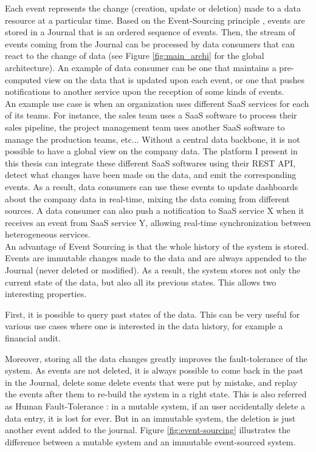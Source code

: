 Each event represents the change (creation, update or deletion) made to a data resource at a particular time. Based on the Event-Sourcing principle , events are stored in a Journal that is an ordered sequence of events. Then, the stream of events coming from the Journal can be processed by data consumers that can react to the change of data (see Figure \ref{fig:main_archi} for the global architecture). 
An example of data consumer can be one that maintains a pre-computed view on the data that is updated upon each event, or one that pushes 
notifications to another service upon the reception of some kinds of events.
\\

An example use case is when an organization uses different SaaS services for each of its teams. For instance, the sales
team uses a SaaS software to process their sales pipeline, the project management team uses another SaaS software to manage
the production teams, etc... Without a central data backbone, it is not possible to have a global view on the company data.
The platform I present in this thesis can integrate these different SaaS softwares using their REST API, detect what
changes have been made on the data, and emit the corresponding events. As a result, data consumers can use these events
to update dashboards about the company data in real-time, mixing the data coming from different sources. A data consumer can also push a
notification to SaaS service X when it receives an event from SaaS service Y, allowing real-time synchronization between
heterogeneous services.
\\

An advantage of Event Sourcing is that the whole history of the system is stored. Events are immutable changes made to the data
and are always appended to the Journal (never deleted or modified). As a result, the system stores not only the current state
of the data, but also all its previous states. This allows two interesting properties.

First, it is possible to query past states of the data. This can be very useful for various use cases
where one is interested in the data history, for example a financial audit.

Moreover, storing all the data changes greatly improves the fault-tolerance of the system. As events are not deleted, it is always possible 
to come back in the past in the Journal, delete some delete events that were put by mistake, and replay the events after
them to re-build the system in a right state. This is also referred as Human Fault-Tolerance : in a mutable system,
if an user accidentally delete a data entry, it is lost for ever. But in an immutable system, the deletion is just another
event added to the journal. Figure \ref{fig:event-sourcing} illustrates the difference between a mutable system and an immutable event-sourced system.
\\ 

